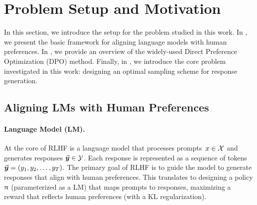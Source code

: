 
	\vspace{-5pt}
	\section{Problem Setup and Motivation}\label{sec:setup}
	
	In this section, we introduce the setup for the problem studied in this work. In , we present the basic framework for aligning language models with human preferences. In , we provide an overview of the widely-used Direct Preference Optimization (DPO) method. Finally, in , we introduce the core problem investigated in this work: designing an optimal sampling scheme for response generation.
	\vspace{-3pt}
	\subsection{Aligning LMs with Human Preferences}
	\label{sec:intro_alignment}
	
	
	\paragraph{Language Model (LM).}
	At the core of RLHF is a language model that processes prompts~\mbox{$x \in \mathcal{X}$} and generates responses $ \vec{\boldsymbol{y}}\!\, \in \mathcal{Y} $. 
	Each response is represented as a sequence of tokens $\vec{\boldsymbol{y}}\!\, = (y_{1}, y_{2}, \ldots, y_{T}).$ The primary goal of RLHF is to guide the model to generate responses that align with human preferences. This translates to designing a policy $\uppi$ (parameterized as a LM) that maps prompts to responses, maximizing a reward that reflects human preferences (with a KL regularization).
	
	
